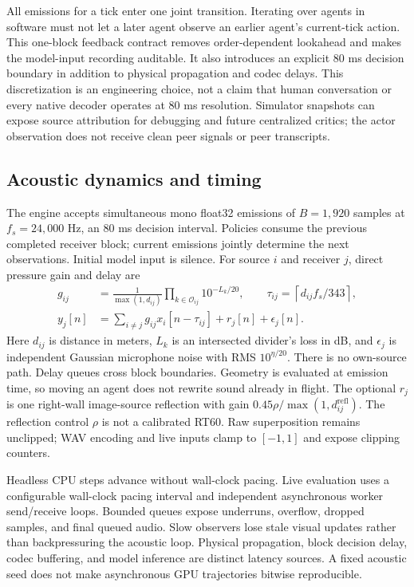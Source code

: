 \documentclass{article}
\begin{document}
All emissions for a tick enter one joint transition. Iterating over agents in software must not let a later agent observe an earlier agent's current-tick action. This one-block feedback contract removes order-dependent lookahead and makes the model-input recording auditable. It also introduces an explicit 80 ms decision boundary in addition to physical propagation and codec delays. This discretization is an engineering choice, not a claim that human conversation or every native decoder operates at 80 ms resolution. Simulator snapshots can expose source attribution for debugging and future centralized critics; the actor observation does not receive clean peer signals or peer transcripts.

\subsection{Acoustic dynamics and timing}
The engine accepts simultaneous mono float32 emissions of $B=1{,}920$ samples at $f_s=24{,}000$ Hz, an 80 ms decision interval. Policies consume the previous completed receiver block; current emissions jointly determine the next observations. Initial model input is silence. For source $i$ and receiver $j$, direct pressure gain and delay are
\begin{align}
 g_{ij}&=\frac{1}{\max(1,d_{ij})}\prod_{k\in\mathcal O_{ij}}10^{-L_k/20},\qquad
 \tau_{ij}=\left\lceil d_{ij}f_s/343\right\rceil,
 \\
 y_j[n]&=\sum_{i\ne j}g_{ij}x_i[n-\tau_{ij}]+r_j[n]+\epsilon_j[n].
\end{align}
Here $d_{ij}$ is distance in meters, $L_k$ is an intersected divider's loss in dB, and $\epsilon_j$ is independent Gaussian microphone noise with RMS $10^{\eta/20}$. There is no own-source path. Delay queues cross block boundaries. Geometry is evaluated at emission time, so moving an agent does not rewrite sound already in flight. The optional $r_j$ is one right-wall image-source reflection with gain $0.45\rho/\max(1,d^{\mathrm{refl}}_{ij})$. The reflection control $\rho$ is not a calibrated RT60. Raw superposition remains unclipped; WAV encoding and live inputs clamp to $[-1,1]$ and expose clipping counters.

Headless CPU steps advance without wall-clock pacing. Live evaluation uses a configurable wall-clock pacing interval and independent asynchronous worker send/receive loops. Bounded queues expose underruns, overflow, dropped samples, and final queued audio. Slow observers lose stale visual updates rather than backpressuring the acoustic loop. Physical propagation, block decision delay, codec buffering, and model inference are distinct latency sources. A fixed acoustic seed does not make asynchronous GPU trajectories bitwise reproducible.
\end{document}
